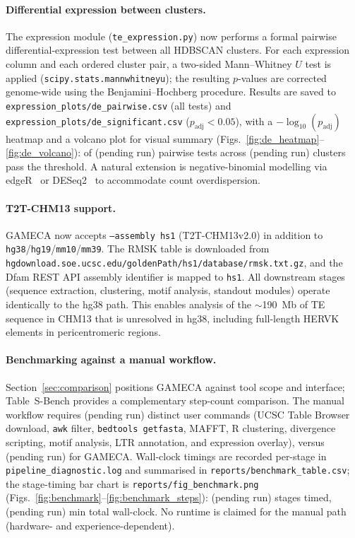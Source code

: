 \documentclass[11pt]{article}
\providecommand{\deNClusters}{(pending run)}\providecommand{\deNTests}{(pending run)}
\providecommand{\benchGAMECAsteps}{(pending run)}\providecommand{\benchManualSteps}{(pending run)}
\providecommand{\benchNStages}{(pending run)}\providecommand{\benchTotalSec}{(pending run)}
\providecommand{\benchTotalMin}{(pending run)}
\begin{document}
\paragraph{Differential expression between clusters.}
The expression module (\texttt{te\_expression.py}) now performs a formal pairwise
differential-expression test between all HDBSCAN clusters.  For each expression column
and each ordered cluster pair, a two-sided Mann--Whitney $U$ test is applied
(\texttt{scipy.stats.mannwhitneyu}); the resulting $p$-values are corrected
genome-wide using the Benjamini--Hochberg procedure.  Results are saved to
\texttt{expression\_plots/de\_pairwise.csv} (all tests) and
\texttt{expression\_plots/de\_significant.csv} ($p_\mathrm{adj} < 0.05$), with a
$-\log_{10}(p_\mathrm{adj})$ heatmap and a volcano plot for visual summary
(Figs.~\ref{fig:de_heatmap}--\ref{fig:de_volcano}): \deNSignificant{} of
\deNTests{} pairwise tests across \deNClusters{} clusters pass the threshold.
A natural extension is negative-binomial modelling via edgeR~\citep{robinson2010edger}
or DESeq2~\citep{love2014deseq2} to accommodate count overdispersion.

\paragraph{T2T-CHM13 support.}
GAMECA now accepts \texttt{--assembly hs1} (T2T-CHM13v2.0) in addition to
\texttt{hg38}/\texttt{hg19}/\texttt{mm10}/\texttt{mm39}.  The RMSK table is
downloaded from \texttt{hgdownload.soe.ucsc.edu/goldenPath/hs1/database/rmsk.txt.gz},
and the Dfam REST API assembly identifier is mapped to \texttt{hs1}.  All downstream
stages (sequence extraction, clustering, motif analysis, standout modules) operate
identically to the hg38 path.  This enables analysis of the $\sim$190~Mb of TE
sequence in CHM13 that is unresolved in hg38, including full-length HERVK elements
in pericentromeric regions.

\paragraph{Benchmarking against a manual workflow.}
Section~\ref{sec:comparison} positions GAMECA against tool scope and interface;
Table~S-Bench provides a complementary step-count comparison.  The manual workflow
requires \benchManualSteps{} distinct user commands (UCSC Table Browser download,
\texttt{awk} filter, \texttt{bedtools getfasta}, MAFFT, R clustering, divergence
scripting, motif analysis, LTR annotation, and expression overlay), versus
\benchGAMECAsteps{} for GAMECA.  Wall-clock timings are recorded
per-stage in \texttt{pipeline\_diagnostic.log} and summarised in
\texttt{reports/benchmark\_table.csv}; the stage-timing bar chart is
\texttt{reports/fig\_benchmark.png} (Figs.~\ref{fig:benchmark}--\ref{fig:benchmark_steps}):
\benchNStages{} stages timed, \benchTotalMin{} min total wall-clock.  No runtime is claimed
for the manual path (hardware- and experience-dependent).
\end{document}
